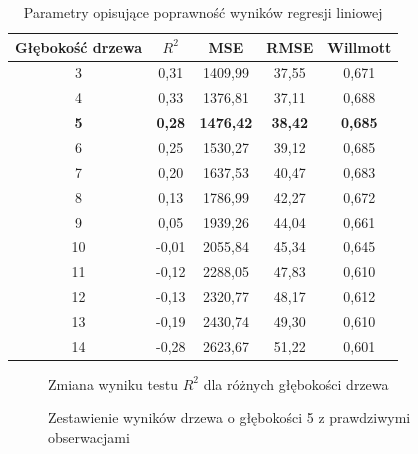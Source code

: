 \documentclass[10pt,a4paper]{article}
\begin{document}
\begin{table}[h!]
	\centering
	\begin{tabular}{|c|c|c|c|c|}
		\hline
		Głębokość drzewa & $R^2$ & MSE & RMSE & Willmott \\
		\hline
		3  & 0,31  & 1409,99 & 37,55 & 0,671 \\
		4  & 0,33  & 1376,81 & 37,11 & 0,688 \\
		\textbf{5}  & \textbf{0,28}  & \textbf{1476,42} & \textbf{38,42} & \textbf{0,685} \\
		6  & 0,25  & 1530,27 & 39,12 & 0,685 \\
		7  & 0,20  & 1637,53 & 40,47 & 0,683 \\
		8  & 0,13  & 1786,99 & 42,27 & 0,672 \\
		9  & 0,05  & 1939,26 & 44,04 & 0,661 \\
		10 & -0,01 & 2055,84 & 45,34 & 0,645 \\
		11 & -0,12 & 2288,05 & 47,83 & 0,610 \\
		12 & -0,13 & 2320,77 & 48,17 & 0,612 \\
		13 & -0,19 & 2430,74 & 49,30 & 0,610 \\
		14 & -0,28 & 2623,67 & 51,22 & 0,601 \\
		\hline
	\end{tabular}
	\caption{Parametry opisujące poprawność wyników regresji liniowej}
	\label{table:2}
\end{table}
\begin{figure}[!ht]
	\centering
	\caption{Zmiana wyniku testu $R^2$ dla różnych głębokości drzewa}
	\label{figure:treer2}
\end{figure}
\FloatBarrier
\begin{figure}[!ht]
	\centering
	\caption{Zestawienie wyników drzewa o głębokości 5 z prawdziwymi obserwacjami}
	\label{figure:tree5}
\end{figure}
\end{document}
